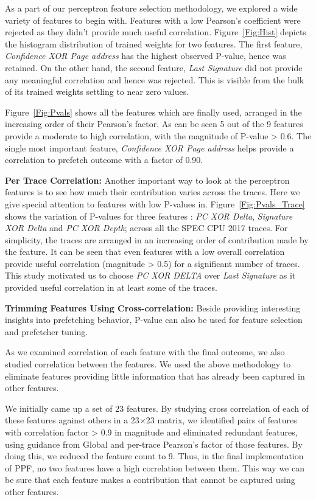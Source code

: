 As a part of our perceptron feature selection methodology, we explored
a wide variety of features to begin with. Features with a low
Pearson's coefficient were rejected as they didn't provide much useful
correlation.  Figure~\ref{Fig:Hist} depicts the histogram distribution
of trained weights for two features.  The first feature,
\textit{Confidence XOR Page address} has the highest observed P-value,
hence was retained.  On the other hand, the second feature,
\textit{Last Signature} did not provide any meaningful correlation and
hence was rejected.  This is visible from the bulk of its trained
weights settling to near zero values.

Figure~\ref{Fig:Pvals} shows all the features which are finally used,
arranged in the increasing order of their Pearson's factor.  As can be
seen 5 out of the 9 features provide a moderate to high correlation,
with the magnitude of P-value > 0.6. The single most important
feature, \textit{Confidence XOR Page address} helps provide
a correlation to prefetch outcome with a factor of 0.90. 

\noindent \textbf{Per Trace Correlation:} Another important way to look
at the perceptron features is to see how much their contribution
varies across the traces. Here we give special attention to features
with low P-values in. Figure~\ref{Fig:Pvals_Trace} shows the variation
of P-values for three features : \textit{PC XOR Delta},
\textit{Signature XOR Delta} and \textit{PC XOR Depth}; across all the
SPEC CPU 2017 traces.  For simplicity, the traces are arranged in an
increasing order of contribution made by the feature.  It can be seen
that even features with a low overall correlation provide useful
correlation (magnitude > 0.5) for a significant number of traces. This
study motivated us to choose \textit{PC XOR DELTA} over \textit{Last
  Signature} as it provided useful correlation in at least some of the
traces.

\noindent \textbf{Trimming Features Using Cross-correlation:} Beside
providing interesting insights into prefetching behavior, P-value can
also be used for feature selection and prefetcher tuning.

As we examined correlation of each feature with the final outcome, we
also studied correlation between the features.  We used the above
methodology to eliminate features providing little information that
has already been captured in other features.

We initially came up a set of 23 features.  By studying cross
correlation of each of these features against others in a 23$\times$23
matrix, we identified pairs of features with correlation factor > 0.9
in magnitude and eliminated redundant features, using guidance from
Global and per-trace Pearson's factor of those features.  By doing
this, we reduced the feature count to 9.  Thus, in the final
implementation of PPF, no two features have a high correlation between
them. This way we can be sure that each feature makes a contribution
that cannot be captured using other features.

